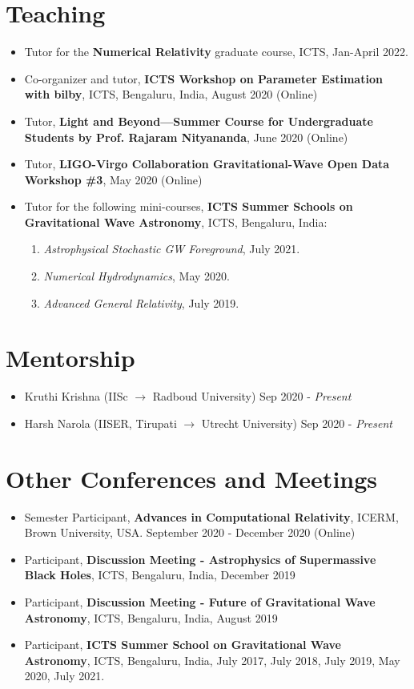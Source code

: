 \documentclass[margin, centered]{res}
\begin{document}
\begin{resume}
\begin{itemize}[leftmargin=*]
\end{itemize}

\section{Teaching}
\begin{itemize}[leftmargin=*]
	\item Tutor for the \textbf{Numerical Relativity} graduate course, ICTS, Jan-April 2022.
	\item Co-organizer and tutor, \textbf{ICTS Workshop on Parameter Estimation with bilby}, ICTS, Bengaluru, India, August 2020 (Online)
	\item Tutor, \textbf{Light and Beyond---Summer Course for Undergraduate Students by Prof. Rajaram Nityananda}, June 2020 (Online)
	\item Tutor, \textbf{LIGO-Virgo Collaboration Gravitational-Wave Open Data Workshop \#3}, May 2020 (Online)
	\item Tutor for the following mini-courses, \textbf{ICTS Summer Schools on Gravitational Wave Astronomy}, ICTS, Bengaluru, India:
	\begin{enumerate}
		\item \textit{Astrophysical Stochastic GW Foreground}, July 2021.
		\item \textit{Numerical Hydrodynamics}, May 2020.
		\item \textit{Advanced General Relativity}, July 2019.
	\end{enumerate}
\end{itemize}


\section{Mentorship}
\begin{itemize}[leftmargin=*]
	\item Kruthi Krishna (IISc $ \rightarrow $ Radboud University) \hfill Sep 2020 - \textit{Present}
	\item Harsh Narola (IISER, Tirupati $ \rightarrow $ Utrecht University) \hfill Sep 2020 - \textit{Present}
\end{itemize}

\section{Other Conferences and Meetings}
\begin{itemize}[leftmargin=*]
	\item Semester Participant, \textbf{Advances in Computational Relativity}, ICERM, Brown University, USA. September 2020 - December 2020 (Online)
	\item	Participant, \textbf{Discussion Meeting - Astrophysics of Supermassive Black Holes}, ICTS, Bengaluru, India, December 2019
	\item Participant, \textbf{Discussion Meeting - Future of Gravitational Wave Astronomy}, ICTS, Bengaluru, India, August 2019
	\item Participant, \textbf{ICTS Summer School on Gravitational Wave Astronomy}, ICTS, Bengaluru, India, July 2017, July 2018, July 2019, May 2020, July 2021.


\end{itemize}
\end{resume}
\end{document}
